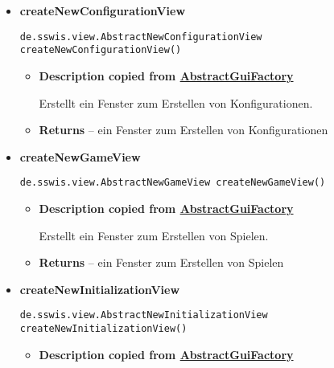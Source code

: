{{{{{{{\begin{itemize}
{\begin{itemize}
{Erstellt eine Ergebnisansicht mit allen Simulationen einer Multikonfiguration.
}
\item{{\bf  Returns} -- 
eine Ergebnisansicht mit allen Simulationen einer Multikonfiguration 
}%
\end{itemize}
}%
\item{ 
\hypertarget{de.sswis.controller.SwingGuiFactory.createNewConfigurationView()}{{\bf  createNewConfigurationView}\\}
\begin{lstlisting}[frame=none]
de.sswis.view.AbstractNewConfigurationView createNewConfigurationView()\end{lstlisting} %
\begin{itemize}
\item{
{\bf  Description copied from \hyperlink{de.sswis.controller.AbstractGuiFactory}{AbstractGuiFactory}{\small {}} }

Erstellt ein Fenster zum Erstellen von Konfigurationen.
}
\item{{\bf  Returns} -- 
ein Fenster zum Erstellen von Konfigurationen 
}%
\end{itemize}
}%
\item{ 
\hypertarget{de.sswis.controller.SwingGuiFactory.createNewGameView()}{{\bf  createNewGameView}\\}
\begin{lstlisting}[frame=none]
de.sswis.view.AbstractNewGameView createNewGameView()\end{lstlisting} %
\begin{itemize}
\item{
{\bf  Description copied from \hyperlink{de.sswis.controller.AbstractGuiFactory}{AbstractGuiFactory}{\small {}} }

Erstellt ein Fenster zum Erstellen von Spielen.
}
\item{{\bf  Returns} -- 
ein Fenster zum Erstellen von Spielen 
}%
\end{itemize}
}%
\item{ 
\hypertarget{de.sswis.controller.SwingGuiFactory.createNewInitializationView()}{{\bf  createNewInitializationView}\\}
\begin{lstlisting}[frame=none]
de.sswis.view.AbstractNewInitializationView createNewInitializationView()\end{lstlisting} %
\begin{itemize}
\item{
{\bf  Description copied from \hyperlink{de.sswis.controller.AbstractGuiFactory}{AbstractGuiFactory}{\small {}} }

}
\end{itemize}}
\end{itemize}}}}}}}}
